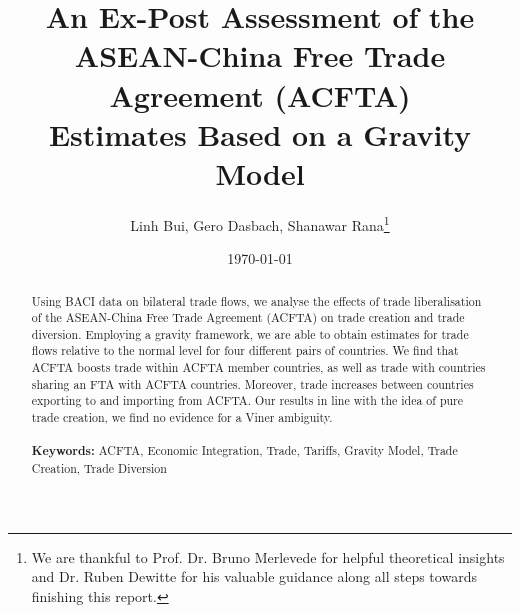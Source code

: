 \documentclass[a4paper,11pt]{article}
\begin{document}
\title{An Ex-Post Assessment of the ASEAN-China Free Trade Agreement (ACFTA) \\ Estimates Based on a Gravity Model}
\author{Linh Bui, Gero Dasbach, Shanawar Rana\thanks{We are thankful to Prof. Dr. Bruno Merlevede for helpful theoretical insights and Dr. Ruben Dewitte for his valuable guidance along all steps towards finishing this report.}}
\date{\today}
\maketitle
\begin{abstract}
\noindent Using BACI data on bilateral trade flows, we analyse the effects of trade liberalisation of the ASEAN-China Free Trade Agreement (ACFTA) on trade creation and trade diversion. Employing a gravity framework, we are able to obtain estimates for trade flows relative to the normal level for four different pairs of countries. We find that ACFTA boosts trade within ACFTA member countries, as well as trade with countries sharing an FTA with ACFTA countries. Moreover, trade increases between countries exporting to and importing from ACFTA. Our results in line with the idea of pure trade creation, we find no evidence for a Viner ambiguity.  \\ \\
\noindent \textbf{Keywords: } ACFTA, Economic Integration, Trade, Tariffs, Gravity Model, Trade Creation, Trade Diversion\\
\end{abstract}

\newpage















\end{document}
